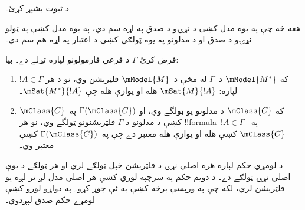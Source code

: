 \documentclass[../../../include/open-logic-section]{subfiles}
\begin{document}
\begin{prob}
  د  ثبوت بشپړ کړئ۔
\end{prob}

هغه څه چې په يوه مدل کښې د نړۍو د صدق په اړه سم دي، په يوه مدل کښې په ټولو نړۍو د صدق
او د مدلونو په يوه ټولګي کښې د اعتبار په اړه هم سم دي۔

\begin{cor}
  فرض کړئ $\Gamma$ د فرعي فارمولونو لپاره تړلے دے۔ بيا:
  \begin{enumerate}
  \item که $\mModel{M^*}$ د~$\Gamma$ له مخې د~$\mModel{M}$
    فلټريشن وي، نو د هر $!A \in \Gamma$ لپاره: $\mSat{M}{!A}$ هله
    او يوازې هله چې $\mSat{M^*}{!A}$۔
  \item که $\mClass{C}$ د مدلونو يو ټولگے وي، او
    $\Gamma(\mClass{C})$ په~$\mClass{C}$ کښې د مدلونو د
    $\Gamma$-فلټريشنونو ټولگے وي، نو هر !!{formula}~$!A \in \Gamma$
    په~$\mClass{C}$ کښې هله او يوازې هله معتبر دے چې
    په~$\Gamma(\mClass{C})$ کښې معتبر وي۔
  \end{enumerate}
\end{cor}
د لومړي حکم لپاره هره اصلي نړۍ د فلټريشن خپل ټولګے لري او هر
ټولګے د يوې اصلي نړۍ ټولګے دے۔ د دويم حکم په سرچپه لوري کښې
هر اصلي مدل لږ تر لږه يو فلټريشن لري، لکه چې په ورپسې برخه
کښې به ئې جوړ کړو۔ په دواړو لورو کښې لومړے حکم صدق لېږدوي۔
\end{document}
